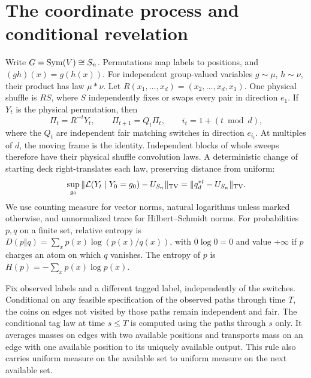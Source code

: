 \section{The coordinate process and conditional revelation}\label{sec:prelim}

Write $G=\operatorname{Sym}(V)\cong S_n$. Permutations map labels to positions,
and $(gh)(x)=g(h(x))$.
For independent group-valued variables $g\sim\mu$, $h\sim\nu$,
their product has law $\mu*\nu$. Let
$R(x_1,\ldots,x_d)=(x_2,\ldots,x_d,x_1)$. One physical shuffle
is $RS$, where $S$ independently fixes or swaps every pair in
direction $e_1$. If $Y_t$ is the physical permutation, then
\begin{equation}\label{eq:frames:cyclic}
 \Pi_t=R^{-t}Y_t,\qquad
 \Pi_{t+1}=Q_t\Pi_t,\qquad i_t=1+(t\bmod d),
\end{equation}
where the $Q_t$ are independent fair matching switches in direction
$e_{i_t}$. At multiples of $d$, the moving frame is the identity.
Independent blocks of whole sweeps therefore have their physical
shuffle convolution laws. A deterministic change of starting deck
right-translates each law, preserving distance from uniform:
\begin{equation}\label{eq:worst-state}
 \sup_{g_0}\|\mathcal L(Y_t\mid Y_0=g_0)-U_{S_n}\|_{\mathrm{TV}}
 =\|q_d^{*t}-U_{S_n}\|_{\mathrm{TV}}.
\end{equation}
We use counting measure for vector norms, natural logarithms unless
marked otherwise, and unnormalized trace for Hilbert--Schmidt norms.
For probabilities $p,q$ on a finite set, relative entropy is
$D(p\Vert q)=\sum_xp(x)\log(p(x)/q(x))$, with $0\log0=0$
and value $+\infty$ if $p$ charges an atom on which $q$ vanishes.
The entropy of $p$ is $H(p)=-\sum_xp(x)\log p(x)$.

\begin{lemma}\label{lem:marginal-averaging}
Fix observed labels and a different tagged label, independently of the
switches. Conditional on any feasible specification of the observed
paths through time $T$, the coins on edges not visited by those paths
remain independent and fair. The conditional tag law at time $s\le T$
is computed using the paths through $s$ only. It averages masses on
edges with two available positions and transports mass on an edge
with one available position to its uniquely available output. This
rule also carries uniform measure on the available set to uniform
measure on the next available set.
\end{lemma}

